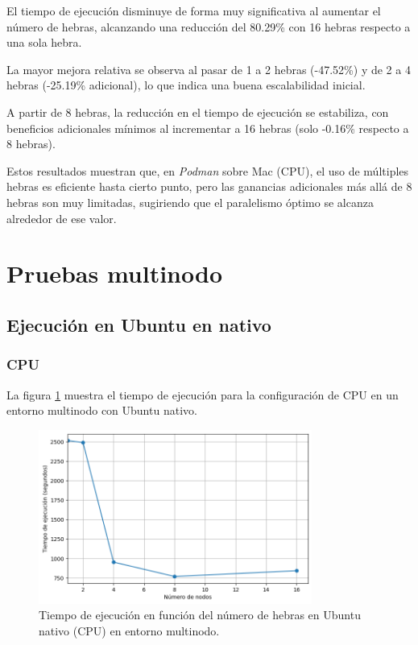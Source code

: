 El tiempo de ejecución disminuye de forma muy significativa al aumentar el número de hebras, alcanzando una reducción del 80.29\% con 16 hebras respecto a una sola hebra.

La mayor mejora relativa se observa al pasar de 1 a 2 hebras (-47.52\%) y de 2 a 4 hebras (-25.19\% adicional), lo que indica una buena escalabilidad inicial.

A partir de 8 hebras, la reducción en el tiempo de ejecución se estabiliza, con beneficios adicionales mínimos al incrementar a 16 hebras (solo -0.16\% respecto a 8 hebras).

Estos resultados muestran que, en \textit{Podman} sobre Mac (CPU), el uso de múltiples hebras es eficiente hasta cierto punto, pero las ganancias adicionales más allá de 8 hebras son muy limitadas, sugiriendo que el paralelismo óptimo se alcanza alrededor de ese valor.

\section{Pruebas multinodo}
\subsection{Ejecución en Ubuntu en nativo}
\subsubsection{CPU}

La figura \ref{fig:multi-node_ubuntu_cpu_native_time} muestra el tiempo de ejecución para la configuración de CPU en un entorno multinodo con Ubuntu nativo.

\begin{figure}[H]
    \centering
    \includegraphics[width=0.8\textwidth]{imagenes/cap5/multi-node_ubuntu_cpu_native_time.png}
    \caption{Tiempo de ejecución en función del número de hebras en Ubuntu nativo (CPU) en entorno multinodo.}
    \label{fig:multi-node_ubuntu_cpu_native_time}
\end{figure}

